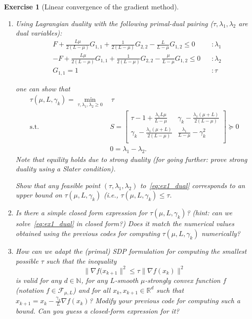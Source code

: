 \documentclass[11pt,a4paper]{article}
\newtheorem{exercise}{Exercise}
\begin{document}
\begin{exercise}[Linear convergence of the gradient method]
\begin{enumerate}
	\item Using Lagrangian duality with the following primal-dual pairing ($\tau,\lambda_1,\lambda_2$ are dual variables):
	\begin{equation*}
			\begin{aligned}
			& F + \tfrac{L\mu}{2(L-\mu)} G_{1,1}+\tfrac{1}{2(L-\mu)}G_{2,2}-\tfrac{L}{L-\mu}G_{1,2}\leqslant 0&&:\lambda_1\\
			&-F + \tfrac{L\mu}{2(L-\mu)} G_{1,1}+\tfrac{1}{2(L-\mu)}G_{2,2}-\tfrac{\mu}{L-\mu}G_{1,2}\leqslant 0&&:\lambda_2\\
			&G_{1,1}= 1&&:\tau
			\end{aligned}
			\end{equation*}
	
	 one can show that
		\begin{equation}\label{eq:ex1_dual}	 
		\begin{aligned}
			\tau(\mu,L,\gamma_k)=\min_{\tau,\lambda_1,\lambda_2\geqslant 0} & \,\tau\\
			\text{s.t. }& S=\begin{bmatrix}
				\tau-1+\frac{\lambda_1 L\mu}{L-\mu } & \gamma_k-\frac{\lambda_1 (\mu +L)}{2 (L-\mu )} \\
				\gamma_k-\frac{\lambda_1 (\mu +L)}{2 (L-\mu )} & \frac{\lambda_1}{L-\mu }-\gamma_k^2 \\
			\end{bmatrix}\succcurlyeq 0\\
			&0=\lambda_1-\lambda_2.
		\end{aligned}
		\end{equation}
	Note that equility holds due to strong duality (for going further: prove strong duality using a Slater condition). 
	
	Show that any feasible point $(\tau,\lambda_1,\lambda_2)$ to~\eqref{eq:ex1_dual} corresponds to an upper bound on $\tau(\mu,L,\gamma_k)$ (i.e., $\tau(\mu,L,\gamma_k)\leqslant \tau$.
	
	\item Is there a simple closed form expression for $\tau(\mu,L,\gamma_k)$? (hint: can we solve~\eqref{eq:ex1_dual} in closed form?) Does it match the numerical values obtained using the previous codes for computing $\tau(\mu,L,\gamma_k)$ numerically?
	\item How can we adapt the (primal) SDP formulation for computing the smallest possible $\tau$ such that the inequality
	\[ \|\nabla f(x_{k+1}\|^2 \leqslant \tau \|\nabla f(x_k)\|^2\]
	is valid for any $d\in\mathbb{N}$, for any $L$-smooth $\mu$-strongly convex function $f$ (notation $f\in\mathcal{F}_{\mu,L}$) and for all $x_k,x_{k+1}\in\mathbb{R}^d$ such that $x_{k+1}=x_k-\frac{\gamma_k}{L} \nabla f(x_k)$? Modify your previous code for computing such a bound. Can you guess a closed-form expression for it?
	

\end{enumerate}
\end{exercise}
\end{document}
